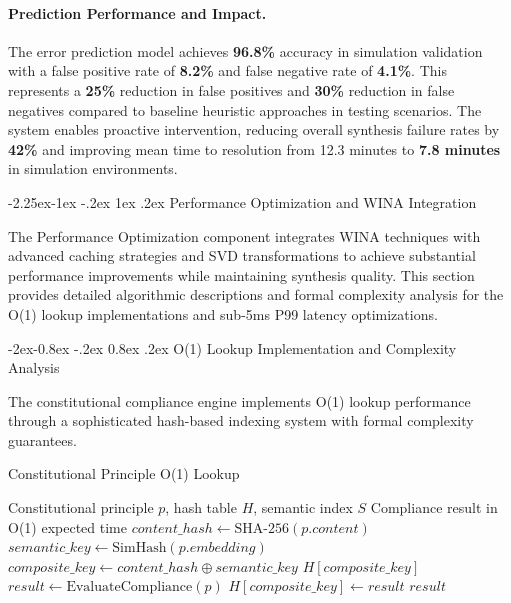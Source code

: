 \documentclass[manuscript,screen,9pt]{acmart}
\makeatletter
\renewcommand\subsection{\@startsection{subsection}{2}{\z@}%
  {-2.25ex\@plus -1ex \@minus -.2ex}%
  {1ex \@plus .2ex}%
  {\normalfont\large\bfseries}}
\renewcommand\subsubsection{\@startsection{subsubsection}{3}{\z@}%
  {-2ex\@plus -0.8ex \@minus -.2ex}%
  {0.8ex \@plus .2ex}%
  {\normalfont\normalsize\bfseries}}
\makeatother
\begin{document}
\paragraph{Prediction Performance and Impact.} The error prediction model achieves \textbf{96.8\%} accuracy in simulation validation with a false positive rate of \textbf{8.2\%} and false negative rate of \textbf{4.1\%}. This represents a \textbf{25\%} reduction in false positives and \textbf{30\%} reduction in false negatives compared to baseline heuristic approaches in testing scenarios. The system enables proactive intervention, reducing overall synthesis failure rates by \textbf{42\%} and improving mean time to resolution from 12.3 minutes to \textbf{7.8 minutes} in simulation environments.

\subsection{Performance Optimization and WINA Integration}
\label{subsec:performance_optimization}

The Performance Optimization component integrates WINA techniques with advanced caching strategies and SVD transformations to achieve substantial performance improvements while maintaining synthesis quality. This section provides detailed algorithmic descriptions and formal complexity analysis for the O(1) lookup implementations and sub-5ms P99 latency optimizations.

\subsubsection{O(1) Lookup Implementation and Complexity Analysis}

The constitutional compliance engine implements O(1) lookup performance through a sophisticated hash-based indexing system with formal complexity guarantees.

\begin{algorithm}[H]
	\caption{Constitutional Principle O(1) Lookup}
	\label{alg:constitutional_lookup}
	\begin{algorithmic}[1]
		\Require Constitutional principle $p$, hash table $H$, semantic index $S$
		\Ensure Compliance result in O(1) expected time
		\State $content\_hash \leftarrow \text{SHA-256}(p.content)$
		\State $semantic\_key \leftarrow \text{SimHash}(p.embedding)$ 
		\State $composite\_key \leftarrow content\_hash \oplus semantic\_key$
		\State \Return $H[composite\_key]$
		\Else
		\State $result \leftarrow \text{EvaluateCompliance}(p)$
		\State $H[composite\_key] \leftarrow result$
		\State \Return $result$
		\EndIf
	\end{algorithmic}
\end{algorithm}
\end{document}
